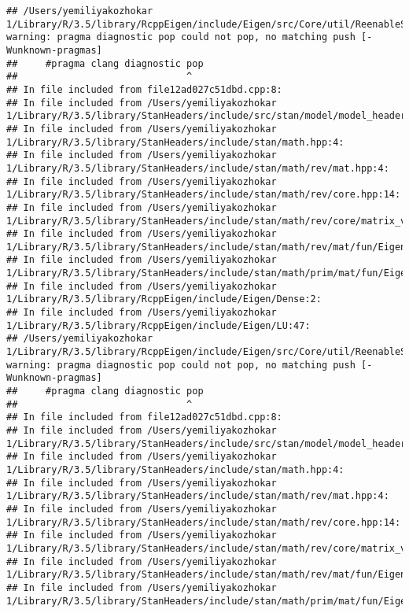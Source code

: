 \documentclass[]{article}
\begin{document}
\begin{verbatim}
## /Users/yemiliyakozhokar 1/Library/R/3.5/library/RcppEigen/include/Eigen/src/Core/util/ReenableStupidWarnings.h:10:30: warning: pragma diagnostic pop could not pop, no matching push [-Wunknown-pragmas]
##     #pragma clang diagnostic pop
##                              ^
## In file included from file12ad027c51dbd.cpp:8:
## In file included from /Users/yemiliyakozhokar 1/Library/R/3.5/library/StanHeaders/include/src/stan/model/model_header.hpp:4:
## In file included from /Users/yemiliyakozhokar 1/Library/R/3.5/library/StanHeaders/include/stan/math.hpp:4:
## In file included from /Users/yemiliyakozhokar 1/Library/R/3.5/library/StanHeaders/include/stan/math/rev/mat.hpp:4:
## In file included from /Users/yemiliyakozhokar 1/Library/R/3.5/library/StanHeaders/include/stan/math/rev/core.hpp:14:
## In file included from /Users/yemiliyakozhokar 1/Library/R/3.5/library/StanHeaders/include/stan/math/rev/core/matrix_vari.hpp:4:
## In file included from /Users/yemiliyakozhokar 1/Library/R/3.5/library/StanHeaders/include/stan/math/rev/mat/fun/Eigen_NumTraits.hpp:4:
## In file included from /Users/yemiliyakozhokar 1/Library/R/3.5/library/StanHeaders/include/stan/math/prim/mat/fun/Eigen.hpp:4:
## In file included from /Users/yemiliyakozhokar 1/Library/R/3.5/library/RcppEigen/include/Eigen/Dense:2:
## In file included from /Users/yemiliyakozhokar 1/Library/R/3.5/library/RcppEigen/include/Eigen/LU:47:
## /Users/yemiliyakozhokar 1/Library/R/3.5/library/RcppEigen/include/Eigen/src/Core/util/ReenableStupidWarnings.h:10:30: warning: pragma diagnostic pop could not pop, no matching push [-Wunknown-pragmas]
##     #pragma clang diagnostic pop
##                              ^
## In file included from file12ad027c51dbd.cpp:8:
## In file included from /Users/yemiliyakozhokar 1/Library/R/3.5/library/StanHeaders/include/src/stan/model/model_header.hpp:4:
## In file included from /Users/yemiliyakozhokar 1/Library/R/3.5/library/StanHeaders/include/stan/math.hpp:4:
## In file included from /Users/yemiliyakozhokar 1/Library/R/3.5/library/StanHeaders/include/stan/math/rev/mat.hpp:4:
## In file included from /Users/yemiliyakozhokar 1/Library/R/3.5/library/StanHeaders/include/stan/math/rev/core.hpp:14:
## In file included from /Users/yemiliyakozhokar 1/Library/R/3.5/library/StanHeaders/include/stan/math/rev/core/matrix_vari.hpp:4:
## In file included from /Users/yemiliyakozhokar 1/Library/R/3.5/library/StanHeaders/include/stan/math/rev/mat/fun/Eigen_NumTraits.hpp:4:
## In file included from /Users/yemiliyakozhokar 1/Library/R/3.5/library/StanHeaders/include/stan/math/prim/mat/fun/Eigen.hpp:4:

\end{verbatim}
\end{document}

